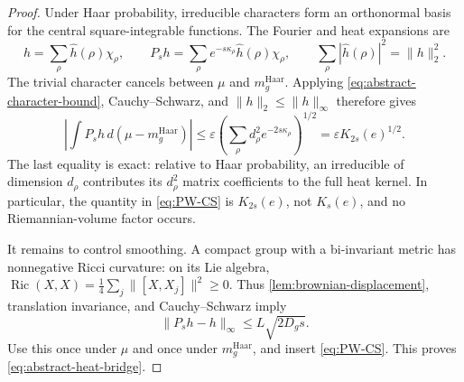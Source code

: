 \begin{proof}
Under Haar probability, irreducible characters form an orthonormal basis for
the central square-integrable functions.  The Fourier and heat expansions are
\begin{equation}
 h=\sum_\rho\widehat h(\rho)\chi_\rho,
 \qquad
 P_sh=\sum_\rho e^{-s\kappa_\rho}
                  \widehat h(\rho)\chi_\rho,
 \qquad
 \sum_\rho|\widehat h(\rho)|^2=\|h\|_2^2.
\label{eq:PW-expansion}
\end{equation}
The trivial character cancels between \(\mu\) and
\(m_g^{\mathrm{Haar}}\).  Applying
\eqref{eq:abstract-character-bound}, Cauchy--Schwarz, and
\(\|h\|_2\le\|h\|_\infty\) therefore gives
\begin{equation}
 \left|\int P_sh\,d(\mu-m_g^{\mathrm{Haar}})\right|
 \le\varepsilon
 \left(\sum_\rho d_\rho^2e^{-2s\kappa_\rho}\right)^{1/2}
 =\varepsilon K_{2s}(e)^{1/2}.
\label{eq:PW-CS}
\end{equation}
The last equality is exact: relative to Haar probability, an irreducible of
dimension \(d_\rho\) contributes its \(d_\rho^2\) matrix coefficients to the
full heat kernel.  In particular, the quantity in \eqref{eq:PW-CS} is
\(K_{2s}(e)\), not \(K_s(e)\), and no Riemannian-volume factor occurs.

It remains to control smoothing.  A compact group with a bi-invariant metric
has nonnegative Ricci curvature: on its Lie algebra,
\(\operatorname{Ric}(X,X)=\frac14\sum_j\|[X,X_j]\|^2\ge0\).
Thus \cref{lem:brownian-displacement}, translation invariance, and
Cauchy--Schwarz imply
\[
 \|P_sh-h\|_\infty\le L\sqrt{2D_gs}.
\]
Use this once under \(\mu\) and once under \(m_g^{\mathrm{Haar}}\), and insert
\eqref{eq:PW-CS}.  This proves \eqref{eq:abstract-heat-bridge}.
\end{proof}
